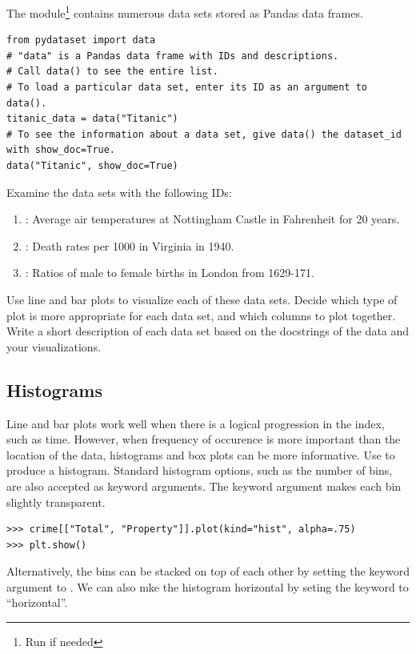 \begin{problem}
\label{prob:one}
The  module\footnote{Run  if needed} contains numerous data sets stored as Pandas data frames.
\begin{lstlisting}
from pydataset import data
# "data" is a Pandas data frame with IDs and descriptions.
# Call data() to see the entire list.
# To load a particular data set, enter its ID as an argument to data().
titanic_data = data("Titanic")
# To see the information about a data set, give data() the dataset_id with show_doc=True.
data("Titanic", show_doc=True)
\end{lstlisting}
Examine the data sets with the following  IDs:
\begin{enumerate}
\item {}: Average air temperatures at Nottingham Castle in Fahrenheit for 20 years.
\item {}: Death rates per 1000 in Virginia in 1940.
\item {}: Ratios of male to female births in London from 1629-171.
\end{enumerate}
Use line and bar plots to visualize each of these data sets.
Decide which type of plot is more appropriate for each data set, and which columns to plot together.
Write a short description of each data set based on the docstrings of the data and your visualizations.
\end{problem}

\subsection*{Histograms}

Line and bar plots work well when there is a logical progression in the index, such as time.
However, when frequency of occurence is more important than the location of the data, histograms and box plots can be more informative.
Use  to produce a histogram.
Standard histogram options, such as the number of bins, are also accepted as keyword arguments.
The  keyword argument makes each bin slightly transparent.

\begin{lstlisting}
>>> crime[["Total", "Property"]].plot(kind="hist", alpha=.75)
>>> plt.show()
\end{lstlisting}

Alternatively, the bins can be stacked on top of each other by setting the  keyword argument to .
We can also mke the histogram horizontal by seting the keyword   to ``horizontal''.

